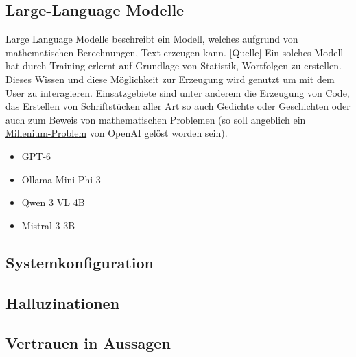 \documentclass[../../main.text]{subfiles}
\begin{document}
\begin{doublespace}
\subsection{Large-Language Modelle}
Large Language Modelle beschreibt ein Modell, welches aufgrund von
mathematischen Berechnungen, Text erzeugen kann. [Quelle]
Ein solches Modell hat durch Training erlernt auf Grundlage von
Statistik, Wortfolgen zu erstellen. Dieses Wissen und diese
Möglichkeit zur Erzeugung wird genutzt um mit dem User zu interagieren.
Einsatzgebiete sind unter anderem die Erzeugung von Code, das Erstellen von
Schriftstücken aller Art so auch Gedichte oder Geschichten oder auch
zum Beweis von mathematischen Problemen (so soll angeblich ein 
\href{https://www.spiegel.de/wissenschaft/kuenstliche-intelligenz-ki-von-openai-soll-millenniumsraetsel-in-88-stunden-geloest-haben-a-ae808aee-1a76-4ad8-9a90-d870f4d64892}{Millenium-Problem} von
OpenAI gelöst worden sein).

\begin{itemize}
    \item GPT-6
    \item Ollama Mini Phi-3
    \item Qwen 3 VL 4B
    \item Mistral 3 3B
\end{itemize}
\subsection{Systemkonfiguration}
\subsection{Halluzinationen}
\subsection{Vertrauen in Aussagen}
\end{doublespace}
\end{document}
